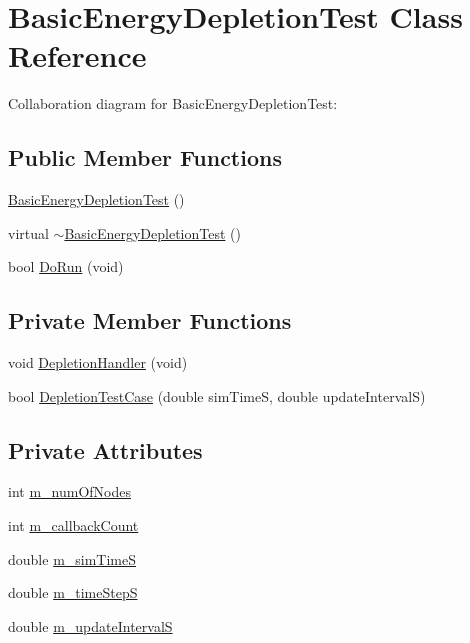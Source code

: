 \hypertarget{classBasicEnergyDepletionTest}{}\section{Basic\+Energy\+Depletion\+Test Class Reference}
\label{classBasicEnergyDepletionTest}


Collaboration diagram for Basic\+Energy\+Depletion\+Test\+:
\subsection*{Public Member Functions}
\begin{DoxyCompactItemize}
\item 
\hyperlink{classBasicEnergyDepletionTest_a28651ccea0509ac93f28b12cb53b1225}{Basic\+Energy\+Depletion\+Test} ()
\item 
virtual \hyperlink{classBasicEnergyDepletionTest_a91de357fa887b37c4eff181d7f83694a}{$\sim$\+Basic\+Energy\+Depletion\+Test} ()
\item 
bool \hyperlink{classBasicEnergyDepletionTest_ab23045f04ad166d09ecba40a935efa01}{Do\+Run} (void)
\end{DoxyCompactItemize}
\subsection*{Private Member Functions}
\begin{DoxyCompactItemize}
\item 
void \hyperlink{classBasicEnergyDepletionTest_af949ebacd8c4fbfbb48d982d15350d23}{Depletion\+Handler} (void)
\item 
bool \hyperlink{classBasicEnergyDepletionTest_a933f0ff2e50a5dc64b4312619405a05a}{Depletion\+Test\+Case} (double sim\+TimeS, double update\+IntervalS)
\end{DoxyCompactItemize}
\subsection*{Private Attributes}
\begin{DoxyCompactItemize}
\item 
int \hyperlink{classBasicEnergyDepletionTest_a80ec49961c2a9652f8648a3e5fe6b6fa}{m\+\_\+num\+Of\+Nodes}
\item 
int \hyperlink{classBasicEnergyDepletionTest_afb076ced2dd133051644c63e7428098b}{m\+\_\+callback\+Count}
\item 
double \hyperlink{classBasicEnergyDepletionTest_a69664b0962981a036c910884a10d42e9}{m\+\_\+sim\+TimeS}
\item 
double \hyperlink{classBasicEnergyDepletionTest_a7aab78ab746425724fcb2e4dc1632e89}{m\+\_\+time\+StepS}
\item 
double \hyperlink{classBasicEnergyDepletionTest_a2e9f6deba1930b5c4ef2ad4c624dbd87}{m\+\_\+update\+IntervalS}
\end{DoxyCompactItemize}


